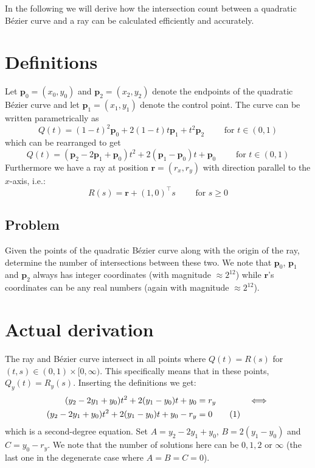 \documentclass[11pt, a4paper]{article}
\newcommand{\numberhere}{\stepcounter{equation}\tag{\theequation}}
\renewcommand\vec[1]{\boldsymbol{#1}}
\begin{document}
In the following we will derive how the intersection count between a quadratic Bézier curve and a ray can be calculated efficiently and accurately.
\section{Definitions}
Let $\vec p_0 = (x_0, y_0)$ and $\vec p_2 = (x_2, y_2)$ denote the endpoints of the quadratic Bézier curve and let $\vec p_1 = (x_1, y_1)$ denote the control point. The curve can be written parametrically as
\begin{equation*}
Q(t) = (1-t)^2 \vec p_0 + 2(1-t)t \vec p_1 + t^2 \vec p_2 \qquad \text{ for } t \in (0, 1)
\end{equation*}
which can be rearranged to get
\begin{equation}
\label{eq:bezierdef}
Q(t) = (\vec p_2 - 2\vec p_1 + \vec p_0)t^2 + 2(\vec p_1 - \vec p_0)t + \vec p_0 \qquad \text{ for } t \in (0, 1)
\end{equation}
Furthermore we have a ray at position $\vec r = (r_x, r_y)$ with direction parallel to the $x$-axis, i.e.:
\begin{equation}
\label{eq:raydef}
R(s) = \vec r + (1, 0)^\top s \qquad \text{ for } s \geq 0
\end{equation}

\subsection{Problem}
Given the points of the quadratic Bézier curve along with the origin of the ray, determine the number of intersections between these two. We note that $\vec p_0$, $\vec p_1$ and $\vec p_2$ always has integer coordinates (with magnitude $\approx 2^{12}$) while $\vec r$'s coordinates can be any real numbers (again with magnitude $\approx 2^{12}$).

\section{Actual derivation}
The ray and Bézier curve intersect in all points where $Q(t) = R(s)$ for $(t, s)\in(0,1)\times[0,\infty)$.
This specifically means that in these points, $Q_y(t) = R_y(s)$. Inserting the definitions we get:
\begin{align*}
(y_2 - 2y_1 + y_0)t^2 + 2(y_1 - y_0)t + y_0 &= r_y &\iff\\
(y_2 - 2y_1 + y_0)t^2 + 2(y_1 - y_0)t + y_0 - r_y &= 0 \numberhere\label{eq:sdeq}
\end{align*}
which is a second-degree equation. Set $A=y_2-2y_1+y_0$, $B=2(y_1-y_0)$ and $C=y_0-r_y$.
We note that the number of solutions here can be $0, 1, 2$ or $\infty$ (the last one in the degenerate case where $A=B=C=0$).
\end{document}
